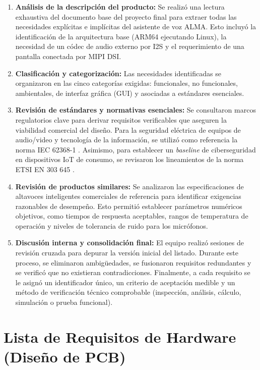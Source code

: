 \documentclass[%
	paper=a4,				%
	twoside=false,				%
	parskip=half,				%
	chapterprefix=false, 		%
	10pt,						%
	headings=normal,			%
	bibliography=totoc,			%
	listof=totoc,				%
	titlepage=on,				%
	captions=tableabove,		%
	draft=false,				%
]{scrbook}%
\begin{document}
\begin{enumerate}
    \item \textbf{Análisis de la descripción del producto:} Se realizó una lectura exhaustiva del documento base del proyecto final \cite{guia_proyecto_final} para extraer todas las necesidades explícitas e implícitas del asistente de voz ALMA. Esto incluyó la identificación de la arquitectura base (ARM64 ejecutando Linux), la necesidad de un códec de audio externo por I2S y el requerimiento de una pantalla conectada por MIPI DSI.
    
    \item \textbf{Clasificación y categorización:} Las necesidades identificadas se organizaron en las cinco categorías exigidas: funcionales, no funcionales, ambientales, de interfaz gráfica (GUI) y asociadas a estándares esenciales.
    
    \item \textbf{Revisión de estándares y normativas esenciales:} Se consultaron marcos regulatorios clave para derivar requisitos verificables que aseguren la viabilidad comercial del diseño. Para la seguridad eléctrica de equipos de audio/video y tecnología de la información, se utilizó como referencia la norma IEC 62368-1 \cite{iec62368}. Asimismo, para establecer un \textit{baseline} de ciberseguridad en dispositivos IoT de consumo, se revisaron los lineamientos de la norma ETSI EN 303 645 \cite{etsi303645}.
    
    \item \textbf{Revisión de productos similares:} Se analizaron las especificaciones de altavoces inteligentes comerciales de referencia para identificar exigencias razonables de desempeño. Esto permitió establecer parámetros numéricos objetivos, como tiempos de respuesta aceptables, rangos de temperatura de operación y niveles de tolerancia de ruido para los micrófonos.
    
    \item \textbf{Discusión interna y consolidación final:} El equipo realizó sesiones de revisión cruzada para depurar la versión inicial del listado. Durante este proceso, se eliminaron ambigüedades, se fusionaron requisitos redundantes y se verificó que no existieran contradicciones. Finalmente, a cada requisito se le asignó un identificador único, un criterio de aceptación medible y un método de verificación técnico comprobable (inspección, análisis, cálculo, simulación o prueba funcional).
\end{enumerate}
\chapter{Lista de Requisitos de Hardware (Diseño de PCB)}
\end{document}
